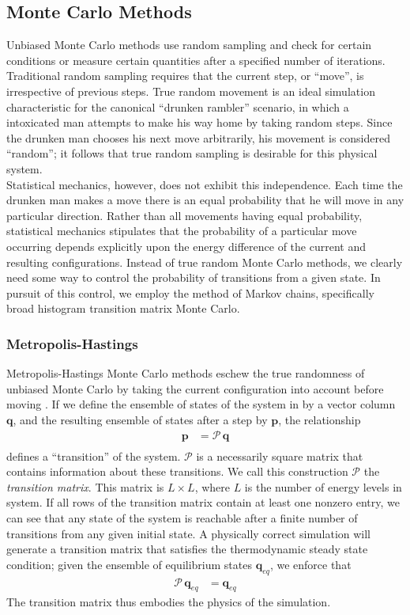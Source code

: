 \documentclass[12pt]{article}
\begin{document}
\subsection{Monte Carlo Methods}

Unbiased Monte Carlo methods use random sampling and check for certain conditions or measure certain quantities after a specified number of iterations. Traditional random sampling requires that the current step, or ``move'', is irrespective of previous steps. True random movement is an ideal simulation characteristic for the canonical ``drunken rambler'' scenario, in which a intoxicated man attempts to make his way home by taking random steps. Since the drunken man chooses his next move arbitrarily, his movement is considered ``random''; it follows that true random sampling is desirable for this physical system. \\

Statistical mechanics, however, does not exhibit this independence. Each time the drunken man makes a move there is an equal probability that he will move in any particular direction. Rather than all movements having equal probability, statistical mechanics stipulates that the probability of a particular move occurring depends explicitly upon the energy difference of the current and resulting configurations. Instead of true random Monte Carlo methods, we clearly need some way to control the probability of transitions from a given state. In pursuit of this control, we employ the method of Markov chains, specifically broad histogram transition matrix Monte Carlo.
\subsubsection{Metropolis-Hastings}
Metropolis-Hastings Monte Carlo methods eschew the true randomness of unbiased Monte Carlo by taking the current configuration into account before moving \cite{metrohastings}. If we define the ensemble of states of the system in by a vector column $\mathbf{q}$, and the resulting ensemble of states after a step by $\mathbf{p}$, the relationship
\begin{align*}
    \mathbf{p} &= \mathcal{P}\, \mathbf{q}\\
\end{align*}
defines a ``transition'' of the system. $\mathcal{P}$ is a necessarily square matrix that contains information about these transitions. We call this construction $\mathcal{P}$ the {\it transition matrix}. This matrix is $L\times L$, where $L$ is the number of energy levels in system. If all rows of the transition matrix contain at least one nonzero entry, we can see that any state of the system is reachable after a finite number of transitions from any given initial state. A physically correct simulation will generate a transition matrix that satisfies the thermodynamic steady state condition; given the ensemble of equilibrium states $\mathbf{q}_{eq}$, we enforce that
\begin{align}
    \mathcal{P}\,\mathbf{q}_{eq} &= \mathbf{q}_{eq}
    \label{thermo-steady-state}
\end{align}
The transition matrix thus embodies the physics of the simulation.
\end{document}
